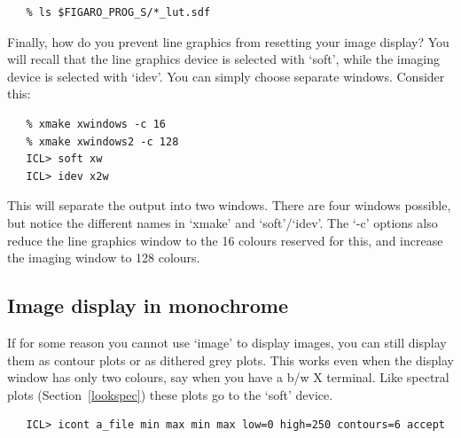 \documentclass[11pt,twoside]{article}
\newcommand{\htmlref}[2]{#1}
\newcommand{\xlabel}[1]{}
\newcommand{\latorhtm}[2]{#1}
\newcommand{\latorhtm}[2]{#2}
\begin{document}
\begin{verbatim}
   % ls $FIGARO_PROG_S/*_lut.sdf
\end{verbatim}

   Finally, how do you prevent line graphics from resetting your image
   display? You will recall that the line graphics device is selected
   with `soft', while the imaging device is selected with `idev'.
   You can simply choose separate windows. Consider this:

\begin{verbatim}
   % xmake xwindows -c 16
   % xmake xwindows2 -c 128
   ICL> soft xw
   ICL> idev x2w
\end{verbatim}

   This will separate the output into two windows. There are four
   windows possible, but notice the different names in `xmake' and
   `soft'/`idev'. The `-c' options also reduce the line graphics
   window to the 16 colours reserved for this, and increase the imaging
   window to 128 colours.


\subsection{\xlabel{lookicont}\label{lookicont}Image display in monochrome}

   If for some reason you cannot use `image' to display images, you
   can still display them as contour plots or as dithered grey plots.
   This works even when the display window has only two colours, say
   when you have a b/w X terminal. Like
   \latorhtm{spectral plots (Section~\ref{lookspec})}
   {\htmlref{spectral plots,}{lookspec}}
   these plots go to the `soft' device.

\begin{verbatim}
   ICL> icont a_file min max min max low=0 high=250 contours=6 accept
\end{verbatim}
\end{document}
